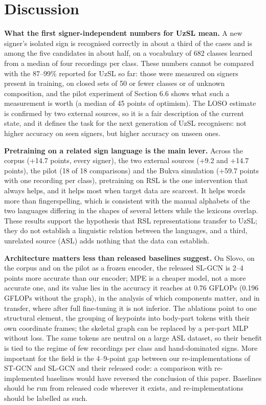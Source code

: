 \hypertarget{discussion}{%
\section{Discussion}\label{discussion}}

\textbf{What the first signer-independent numbers for UzSL mean.} A new signer's isolated sign is recognised correctly in about a third of the cases and is among the five candidates in about half, on a vocabulary of 682 classes learned from a median of four recordings per class. These numbers cannot be compared with the 87--99\% reported for UzSL so far: those were measured on signers present in training, on closed sets of 50 or fewer classes or of unknown composition, and the pilot experiment of Section 6.6 shows what such a measurement is worth (a median of 45 points of optimism). The LOSO estimate is confirmed by two external sources, so it is a fair description of the current state, and it defines the task for the next generation of UzSL recognisers: not higher accuracy on seen signers, but higher accuracy on unseen ones.

\textbf{Pretraining on a related sign language is the main lever.} Across the corpus (+14.7 points, every signer), the two external sources (+9.2 and +14.7 points), the pilot (18 of 18 comparisons) and the Bukva simulation (+59.7 points with one recording per class), pretraining on RSL is the one intervention that always helps, and it helps most when target data are scarcest. It helps words more than fingerspelling, which is consistent with the manual alphabets of the two languages differing in the shapes of several letters while the lexicons overlap. These results support the hypothesis that RSL representations transfer to UzSL; they do not establish a linguistic relation between the languages, and a third, unrelated source (ASL) adds nothing that the data can establish.

\textbf{Architecture matters less than released baselines suggest.} On Slovo, on the corpus and on the pilot as a frozen encoder, the released SL-GCN is 2--4 points more accurate than our encoder; MPE is a cheaper model, not a more accurate one, and its value lies in the accuracy it reaches at 0.76 GFLOPs (0.196 GFLOPs without the graph), in the analysis of which components matter, and in transfer, where after full fine-tuning it is not inferior. The ablations point to one structural element, the grouping of keypoints into body-part tokens with their own coordinate frames; the skeletal graph can be replaced by a per-part MLP without loss. The same tokens are neutral on a large ASL dataset, so their benefit is tied to the regime of few recordings per class and hand-dominated signs. More important for the field is the 4--9-point gap between our re-implementations of ST-GCN and SL-GCN and their released code: a comparison with re-implemented baselines would have reversed the conclusion of this paper. Baselines should be run from released code wherever it exists, and re-implementations should be labelled as such.

